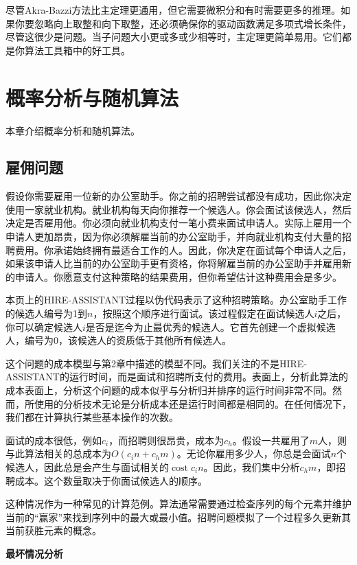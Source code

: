 \documentclass[lang=cn,newtx,10pt,scheme=chinese]{elegantbook}
\begin{document}
尽管Akra-Bazzi方法比主定理更通用，但它需要微积分和有时需要更多的推理。如果你要忽略向上取整和向下取整，还必须确保你的驱动函数满足多项式增长条件，尽管这很少是问题。当子问题大小更或多或少相等时，主定理更简单易用。它们都是你算法工具箱中的好工具。

\chapter{概率分析与随机算法}\label{chapter-05}

本章介绍概率分析和随机算法。

\section{雇佣问题}\label{section-5.1}

假设你需要雇用一位新的办公室助手。你之前的招聘尝试都没有成功，因此你决定使用一家就业机构。就业机构每天向你推荐一个候选人。你会面试该候选人，然后决定是否雇用他。你必须向就业机构支付一笔小费来面试申请人。实际上雇用一个申请人更加昂贵，因为你必须解雇当前的办公室助手，并向就业机构支付大量的招聘费用。你承诺始终拥有最适合工作的人。因此，你决定在面试每个申请人之后，如果该申请人比当前的办公室助手更有资格，你将解雇当前的办公室助手并雇用新的申请人。你愿意支付这种策略的结果费用，但你希望估计这种费用会是多少。

本页上的HIRE-ASSISTANT过程以伪代码表示了这种招聘策略。办公室助手工作的候选人编号为1到$n$，按照这个顺序进行面试。该过程假定在面试候选人$i$之后，你可以确定候选人$i$是否是迄今为止最优秀的候选人。它首先创建一个虚拟候选人，编号为0，该候选人的资质低于其他所有候选人。

这个问题的成本模型与第2章中描述的模型不同。我们关注的不是HIRE-ASSISTANT的运行时间，而是面试和招聘所支付的费用。表面上，分析此算法的成本表面上，分析这个问题的成本似乎与分析归并排序的运行时间非常不同。然而，所使用的分析技术无论是分析成本还是运行时间都是相同的。在任何情况下，我们都在计算执行某些基本操作的次数。

面试的成本很低，例如$c_i$，而招聘则很昂贵，成本为$c_h$。假设一共雇用了$m$人，则与此算法相关的总成本为$O\left(c_i n+c_h m\right)$。无论你雇用多少人，你总是会面试$n$个候选人，因此总是会产生与面试相关的$\operatorname{cost} c_i n$。因此，我们集中分析$c_h m$，即招聘成本。这个数量取决于你面试候选人的顺序。

这种情况作为一种常见的计算范例。算法通常需要通过检查序列的每个元素并维护当前的“赢家”来找到序列中的最大或最小值。招聘问题模拟了一个过程多久更新其当前获胜元素的概念。

\textbf{最坏情况分析}
\end{document}
